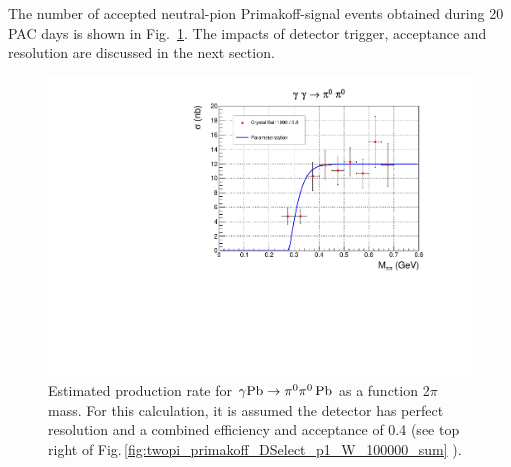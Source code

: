 The number of accepted neutral-pion Primakoff-signal events obtained during 20
PAC days is shown in Fig.~\ref{fig:sigma_2pi0_figs_3}. The impacts of
detector trigger, acceptance and resolution are discussed in the next
section.
\begin{figure}[tph]
\centering
\includegraphics[page=3,width=4.75in]{figures/sigma_2pi0_figs.pdf}
\caption{Estimated production rate  for $\gamma \rm{Pb}\rightarrow \pi^0\pi^0\,\rm{Pb}$ as a function 2$\pi$ mass. For this calculation, it is assumed the detector has perfect resolution and a combined efficiency and acceptance of 0.4 (see top right of Fig.\,\ref{fig:twopi_primakoff_DSelect_p1_W_100000_sum} ).
\label{fig:sigma_2pi0_figs_3}}
\end{figure}

